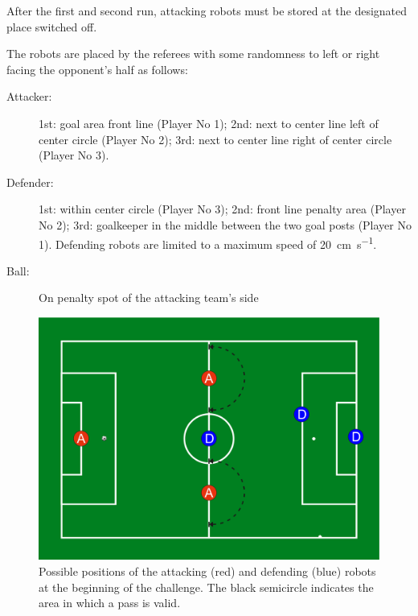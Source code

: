         After the first and second run, attacking robots must be stored at the designated place switched off.

        The robots are placed by the referees with some randomness to left or right facing the opponent's half as follows:

        \begin{description}
            \item[Attacker:] 1st: goal area front line (Player No 1); 2nd: next to center line left of center circle (Player No 2); 3rd: next to center line right of center circle (Player No 3).
            \item[Defender:] 1st: within center circle (Player No 3); 2nd: front line penalty area (Player No 2); 3rd: goalkeeper in the middle between the two goal posts (Player No 1). Defending robots are limited to a maximum speed of \qty{20}{\cm \per \second}.
            \item[Ball:] On penalty spot of the attacking team's side
        \end{description}

        \begin{figure}[t!]
            \begin{center}
                \leavevmode
                \includegraphics[width=1\columnwidth]{figs/ball_handling_positions.pdf}
                \caption{Possible positions of the attacking (red) and defending (blue) robots at the beginning of the challenge. The black semicircle indicates the area in which a pass is valid.}
                \label{fig:ball_handling_positions}
            \end{center}
        \end{figure}

